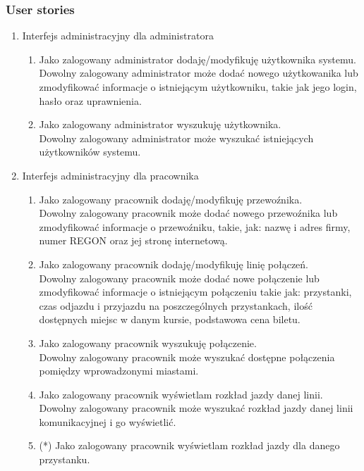 \documentclass[10pt,a4paper]{article}
\begin{document}
\subsubsection*{User stories}
\begin{enumerate}
	\bfseries
	\item Interfejs administracyjny dla administratora
	\begin{enumerate}[label*=\arabic*.]
		\mdseries
		\item Jako zalogowany administrator dodaję/modyfikuję użytkownika systemu.\\
			Dowolny zalogowany administrator może dodać nowego użytkowanika lub zmodyfikować informacje o istniejącym użytkowniku, takie jak jego login, hasło oraz uprawnienia.
		\item Jako zalogowany administrator wyszukuję użytkownika. \\
		    Dowolny zalogowany administrator może wyszukać istniejących użytkowników systemu.
	\end{enumerate}
	\item Interfejs administracyjny dla pracownika
	\begin{enumerate}[label*=\arabic*.]
		\mdseries
		\item Jako zalogowany pracownik dodaję/modyfikuję przewoźnika. \\
			Dowolny zalogowany pracownik może dodać nowego przewoźnika lub zmodyfikować informacje o przewoźniku, takie, jak: nazwę i adres firmy, numer REGON oraz jej stronę internetową.
		\item Jako zalogowany pracownik dodaję/modyfikuję linię połączeń. \\
			Dowolny zalogowany pracownik może dodać nowe połączenie lub zmodyfikować informacje o istniejącym połączeniu takie jak: przystanki, czas odjazdu i przyjazdu na poszczególnych przystankach, ilość dostępnych miejsc w danym kursie, podstawowa cena biletu.
		\item Jako zalogowany pracownik wyszukuję połączenie. \\
		    Dowolny zalogowany pracownik może wyszukać dostępne połączenia pomiędzy
		    wprowadzonymi miastami.
	 	\item Jako zalogowany pracownik wyświetlam rozkład jazdy danej linii. \\
		    Dowolny zalogowany pracownik może wyszukać rozkład jazdy danej linii
		    komunikacyjnej i go wyświetlić.
	 	\item (*) Jako zalogowany pracownik wyświetlam rozkład jazdy dla danego przystanku. \\

\end{enumerate}
\end{enumerate}
\end{document}
